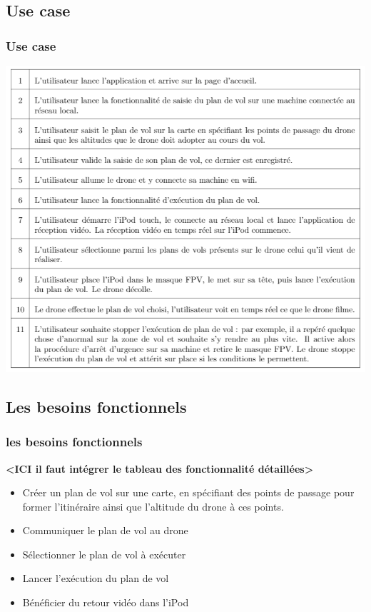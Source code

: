 \documentclass{beamer}
\begin{document}
	\begin{frame}
	\section{Use case}
		\begin{center}
		\frametitle{Use case}
        \includegraphics[scale=0.5]{Use_Case.PNG}
       \end{center}
	\end{frame}
	\begin{frame}
	\section{Les besoins fonctionnels}
		\begin{center}
		\frametitle{les besoins fonctionnels}
        \textbf{<ICI il faut intégrer le tableau des fonctionnalité détaillées>}
		\begin{itemize}
		    \item Créer un plan de vol sur une carte, en spécifiant des points de passage pour former l'itinéraire ainsi que l'altitude du drone à ces points.
		    \item Communiquer le plan de vol au drone
		    \item Sélectionner le plan de vol à exécuter
		    \item Lancer l'exécution du plan de vol
		    \item Bénéficier du retour vidéo dans l'iPod
		\end{itemize}
		\end{center}
	\end{frame}
\end{document}
